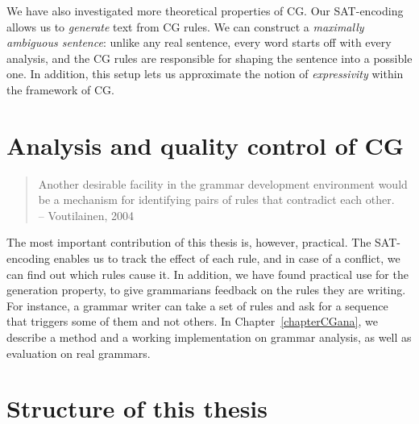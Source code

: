 We have also investigated more theoretical properties of CG.
Our SAT-encoding allows us to \emph{generate} text from CG rules.
We can construct a \emph{maximally ambiguous sentence}: unlike any real sentence, 
every word starts off with every analysis, and the CG rules are responsible for shaping the sentence into a possible one. 
In addition, this setup lets us approximate the notion of \emph{expressivity} within the framework of CG.



\section{Analysis and quality control of CG}

\begin{quote}
Another desirable facility in the grammar development environment would be a mechanism for identifying pairs of rules that contradict each other. \\
-- Voutilainen, 2004
\end{quote}

The most important contribution of this thesis is, however, practical. 
The SAT-encoding enables us to track the effect of each rule, and in case 
of a conflict, we can find out which rules cause it.
In addition, we have found practical use for the generation property, 
to give grammarians feedback on the rules they are writing.
For instance, a grammar writer can take a set of rules and ask for a sequence that triggers some of them and not others.
In Chapter~\ref{chapterCGana}, we describe a method and a working 
implementation on grammar analysis, as well as evaluation on real grammars. 







\section{Structure of this thesis}

